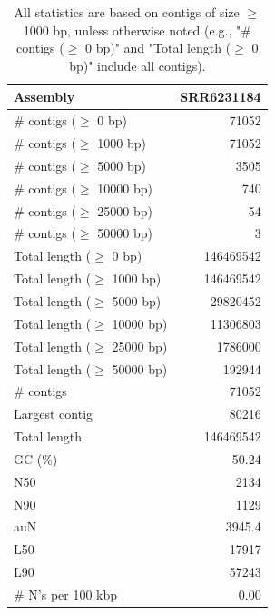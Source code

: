 \documentclass[12pt,a4paper]{article}
\begin{document}
\begin{table}[ht]
\begin{center}
\caption{All statistics are based on contigs of size $\geq$ 1000 bp, unless otherwise noted (e.g., "\# contigs ($\geq$ 0 bp)" and "Total length ($\geq$ 0 bp)" include all contigs).}
\begin{tabular}{|l*{1}{|r}|}
\hline
Assembly & SRR6231184 \\ \hline
\# contigs ($\geq$ 0 bp) & 71052 \\ \hline
\# contigs ($\geq$ 1000 bp) & 71052 \\ \hline
\# contigs ($\geq$ 5000 bp) & 3505 \\ \hline
\# contigs ($\geq$ 10000 bp) & 740 \\ \hline
\# contigs ($\geq$ 25000 bp) & 54 \\ \hline
\# contigs ($\geq$ 50000 bp) & 3 \\ \hline
Total length ($\geq$ 0 bp) & 146469542 \\ \hline
Total length ($\geq$ 1000 bp) & 146469542 \\ \hline
Total length ($\geq$ 5000 bp) & 29820452 \\ \hline
Total length ($\geq$ 10000 bp) & 11306803 \\ \hline
Total length ($\geq$ 25000 bp) & 1786000 \\ \hline
Total length ($\geq$ 50000 bp) & 192944 \\ \hline
\# contigs & 71052 \\ \hline
Largest contig & 80216 \\ \hline
Total length & 146469542 \\ \hline
GC (\%) & 50.24 \\ \hline
N50 & 2134 \\ \hline
N90 & 1129 \\ \hline
auN & 3945.4 \\ \hline
L50 & 17917 \\ \hline
L90 & 57243 \\ \hline
\# N's per 100 kbp & 0.00 \\ \hline
\end{tabular}
\end{center}
\end{table}
\end{document}
